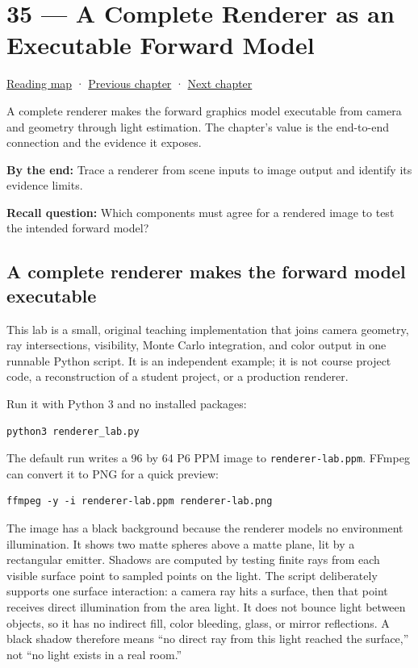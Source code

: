 \hypertarget{04-visual-computing-ii-ch035}{}
\chapter{35 --- A Complete Renderer as an Executable Forward Model}\label{04-visual-computing-ii-ch035-a-complete-renderer-as-an-executable-forward-model}

\hyperref[volume-reading-map]{Reading map} · \hyperref[04-visual-computing-ii-ch034-learned-3d-shapes-and-scene-representations]{Previous chapter} · \hyperref[04-visual-computing-ii-ch036-source-atlas-and-reconstruction-checkpoints]{Next chapter}

A complete renderer makes the forward graphics model executable from camera and geometry through light estimation. The chapter's value is the end-to-end connection and the evidence it exposes.

\textbf{By the end:} Trace a renderer from scene inputs to image output and identify its evidence limits.

\textbf{Recall question:} Which components must agree for a rendered image to test the intended forward model?

\section{A complete renderer makes the forward model executable}\label{04-visual-computing-ii-ch035-a-complete-renderer-makes-the-forward-model-executable}

This lab is a small, original teaching implementation that joins camera geometry, ray intersections, visibility, Monte Carlo integration, and color output in one runnable Python script. It is an independent example; it is not course project code, a reconstruction of a student project, or a production renderer.

Run it with Python 3 and no installed packages:

\begin{verbatim}
python3 renderer_lab.py
\end{verbatim}

The default run writes a 96 by 64 P6 PPM image to \texttt{renderer-lab.ppm}. FFmpeg can convert it to PNG for a quick preview:

\begin{verbatim}
ffmpeg -y -i renderer-lab.ppm renderer-lab.png
\end{verbatim}

The image has a black background because the renderer models no environment illumination. It shows two matte spheres above a matte plane, lit by a rectangular emitter. Shadows are computed by testing finite rays from each visible surface point to sampled points on the light. The script deliberately supports one surface interaction: a camera ray hits a surface, then that point receives direct illumination from the area light. It does not bounce light between objects, so it has no indirect fill, color bleeding, glass, or mirror reflections. A black shadow therefore means ``no direct ray from this light reached the surface,'' not ``no light exists in a real room.''

